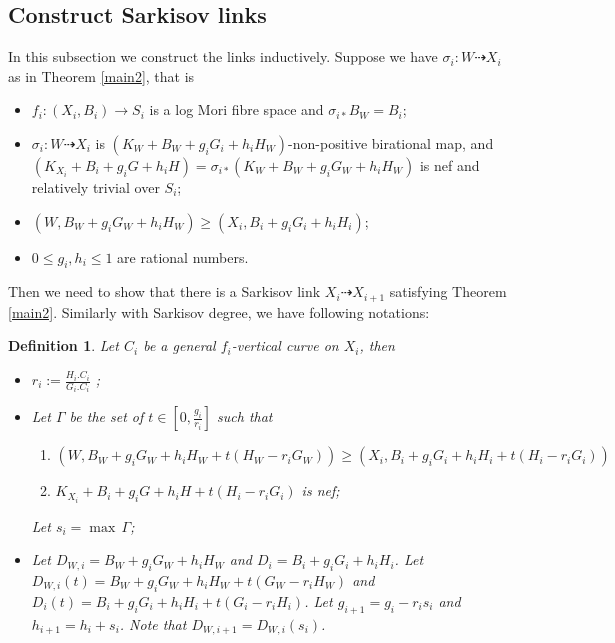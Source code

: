 \documentclass[11pt]{amsart}
\newtheorem{defn}{Definition}[section]
\begin{document}
\subsection{Construct Sarkisov links}
In this subsection we construct the links inductively. Suppose we have $\sigma_{i}:W\dashrightarrow X_{i}$ as in Theorem  \ref{main2}, that is 
\begin{itemize}
  \item $f_{i}:(X_{i},B_{i})\to S_{i}$ is a log Mori fibre space and $\sigma_{i*} B_{W}=B_{i}$;
  \item $\sigma_{i}:W\dashrightarrow  X_{i}$ is $(K_{W}+B_{W}+g_{i}G_{i}+h_{i}H_{W})$-non-positive birational map, and $(K_{X_{i}}+B_{i}+g_{i}G+h_{i}H)=\sigma_{i*}(K_{W}+B_{W}+g_{i}G_{W}+h_{i}H_{W})$ is nef and  relatively trivial over $S_{i}$;
  \item $(W,B_{W}+g_{i}G_{W}+h_{i}H_{W})\geqslant (X_{i},B_{i}+g_{i}G_{i}+h_{i}H_{i})$;
  \item $0\leqslant g_{i},h_{i}\leqslant 1$ are  rational numbers.
\end{itemize}
Then we need to show that there is a Sarkisov link $X_{i}\dashrightarrow X_{i+1}$ satisfying  Theorem \ref{main2}. Similarly with Sarkisov degree, we have following notations:
\begin{defn}
  Let $C_{i}$ be a general $f_{i}$-vertical curve on $X_{i}$, then
  \begin{itemize}
    \item $r_{i}:=\frac{H_{i}.C_{i}}{G_{i}.C_{i}}$ ;
    \item Let $\Gamma$ be the set of $t\in [0,\frac{g_{i}}{r_{i}}] $ such that 
      \begin{enumerate}
        \item\label{singularcondition} $\left(W,B_{W}+g_{i}G_{W}+h_{i}H_{W}+t(H_{W}-r_{i}G_{W})\right)\geqslant \left(X_{i},B_{i}+g_{i}G_{i}+h_{i}H_{i}+t\left(H_{i}-r_{i}G_{i}\right)\right)$
        \item$K_{X_{i}}+B_{i}+g_{i}G+h_{i}H+t(H_{i}-r_{i}G_{i})$ is nef;
    \end{enumerate}
    Let $s_{i}=\max\, \Gamma $;
\item Let $D_{W,i}=B_{W}+g_{i}G_{W}+h_{i}H_{W}$ and $D_{i}=B_{i}+g_{i}G_{i}+h_{i}H_{i}$. Let $D_{W,i}(t)=B_{W}+g_{i}G_{W}+h_{i}H_{W}+t(G_{W}-r_{i}H_{W})$ and $D_{i}(t)=B_{i}+g_{i}G_{i}+h_{i}H_{i}+t (G_{i}-r_{i}H_{i})$. Let $g_{i+1}=g_{i}-r_{i}s_{i}$ and $h_{i+1}=h_{i}+s_{i}$. Note that $D_{W,i+1}=D_{W,i}(s_{i})$. 
  \end{itemize}
\end{defn}
\end{document}
